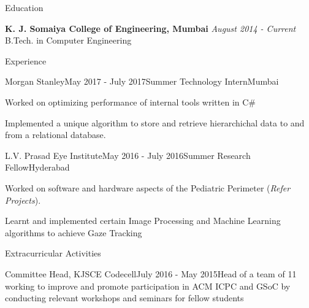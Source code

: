 \documentclass[a4paper]{resume} %
\begin{document}

\begin{rSection}{Education}

{\bf K. J. Somaiya College of Engineering, Mumbai} \hfill {\em August 2014 - Current} \\ 
B.Tech. in Computer Engineering \hfill{} \smallskip{}
\end{rSection}


\begin{rSection}{Experience}
\begin{rSubsection}{Morgan Stanley}{May 2017 - July 2017}{Summer Technology Intern}{Mumbai}
\item Worked on optimizing performance of internal tools written in C\#
\item Implemented a unique algorithm to store and retrieve hierarchichal data to and from a relational database.
\end{rSubsection}


\begin{rSubsection}{L.V. Prasad Eye Institute}{May 2016 - July 2016}{Summer Research Fellow}{Hyderabad}
\item Worked on software and hardware aspects of the Pediatric Perimeter ({\em Refer Projects}).
\item Learnt and implemented certain Image Processing and Machine Learning algorithms to achieve Gaze Tracking 
\end{rSubsection}

\end{rSection}
\begin{rSection}{Extracurricular Activities}
\begin{rProjects}{Committee Head, KJSCE Codecell}{July 2016 - May 2015}{Head of a team of 11 working to improve and promote participation in ACM ICPC and GSoC by conducting relevant workshops and seminars for fellow students}
\end{rProjects}
\end{rSection}
\end{document}

